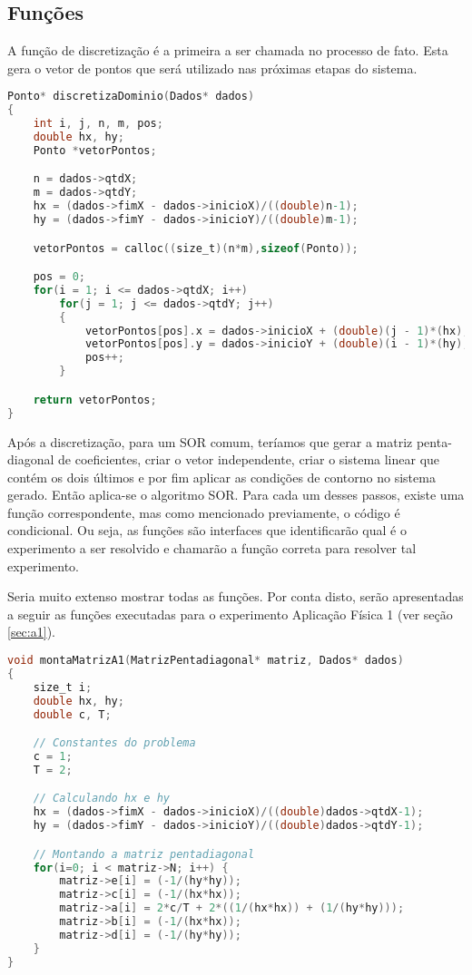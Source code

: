 \documentclass[
	11pt,				%
	oneside,			%
	a4paper,			%
	english,			%
	brazil,				%
	]{article}
\begin{document}
\subsection{Funções}

A função de discretização é a primeira a ser chamada no processo de fato. Esta 
gera o vetor de pontos que será utilizado nas próximas etapas do sistema.
\begin{lstlisting}[language=C, caption=Função de Discretização]
Ponto* discretizaDominio(Dados* dados)
{
	int i, j, n, m, pos;
	double hx, hy;
	Ponto *vetorPontos;

    n = dados->qtdX;
    m = dados->qtdY;
	hx = (dados->fimX - dados->inicioX)/((double)n-1);
	hy = (dados->fimY - dados->inicioY)/((double)m-1);

	vetorPontos = calloc((size_t)(n*m),sizeof(Ponto));

	pos = 0;
	for(i = 1; i <= dados->qtdX; i++)
		for(j = 1; j <= dados->qtdY; j++)
		{
			vetorPontos[pos].x = dados->inicioX + (double)(j - 1)*(hx);
			vetorPontos[pos].y = dados->inicioY + (double)(i - 1)*(hy);
			pos++;
		}

    return vetorPontos;
}
\end{lstlisting}

Após a discretização, para um SOR comum, teríamos que gerar a matriz 
penta-diagonal de coeficientes, criar o vetor independente, criar o sistema 
linear que contém os dois últimos e por fim aplicar as condições de contorno no 
sistema gerado. Então aplica-se o algoritmo SOR. Para cada um desses passos, 
existe uma função correspondente, mas como mencionado previamente, o código é 
condicional. Ou seja, as funções são interfaces que identificarão qual é o 
experimento a ser resolvido e chamarão a função correta para resolver tal 
experimento.

Seria muito extenso mostrar todas as funções. Por conta disto, serão 
apresentadas a seguir as funções executadas para o experimento Aplicação Física 
1 (ver seção \ref{sec:a1}).

\begin{lstlisting}[language=C, caption=Função Montar Matriz A1]
void montaMatrizA1(MatrizPentadiagonal* matriz, Dados* dados)
{
    size_t i;
    double hx, hy;
    double c, T;

    // Constantes do problema
    c = 1;
    T = 2;

    // Calculando hx e hy
	hx = (dados->fimX - dados->inicioX)/((double)dados->qtdX-1);
	hy = (dados->fimY - dados->inicioY)/((double)dados->qtdY-1);

    // Montando a matriz pentadiagonal
    for(i=0; i < matriz->N; i++) {
        matriz->e[i] = (-1/(hy*hy));
        matriz->c[i] = (-1/(hx*hx));
        matriz->a[i] = 2*c/T + 2*((1/(hx*hx)) + (1/(hy*hy)));
        matriz->b[i] = (-1/(hx*hx));
        matriz->d[i] = (-1/(hy*hy));
    }
}
\end{lstlisting}
\end{document}
